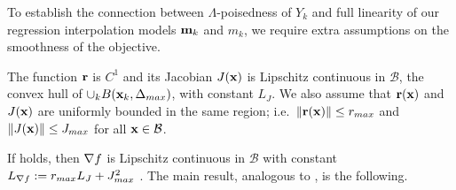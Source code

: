 To establish the connection between $\Lambda$-poisedness of $Y_k$ and full linearity of our regression interpolation models $\mathbf{m}_k$ and $m_k$, we require extra assumptions on the smoothness of the objective.

\begin{assumption} \label{ass_smoothness}
	The function $\mathbf{r}$ is $C^1$ and its Jacobian $J(\mathbf{x})$ is Lipschitz continuous in $\mathcal{B}$, the convex hull of $\cup_k B(\mathbf{x}_k,\Delta_{max})$, with constant $L_J$. 
	We also assume that $\mathbf{r}(\mathbf{x})$ and $J(\mathbf{x})$ are uniformly bounded in the same region; i.e.~$\|\mathbf{r}(\mathbf{x})\|\leq r_{max}$ and $\|J(\mathbf{x})\| \leq J_{max}$ for all $\mathbf{x}\in\mathcal{B}$.
\end{assumption}

If  holds, then $\nabla f$ is Lipschitz continuous in $\mathcal{B}$ with constant $L_{\nabla f} := r_{max}L_J + J_{max}^2$ \cite[Lemma 3.3]{Cartis2017a}.
The main result, analogous to \cite[Lemma 3.4]{Cartis2017a}, is the following.

